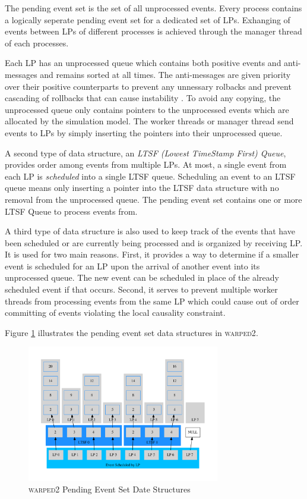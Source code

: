 \documentclass[11pt]{book}
\begin{document}
The pending event set is the set of all unprocessed events. Every process contains a
logically seperate pending event set for a dedicated set of LPs. Exhanging of events
between LPs of different processes is achieved through the manager thread of each processes.

Each LP has an unprocessed queue which contains both positive events and anti-messages and
remains sorted at all times. The anti-messages are given priority over their positive
counterparts to prevent any unnessary rolbacks and prevent cascading of rollbacks that can
cause instability \cite{lubachevsky-89}. To avoid any copying, the unprocessed queue only
contains pointers to the unprocessed events which are allocated by the simulation model. The
worker threads or manager thread send events to LPs by simply inserting the pointers into their
unprocessed queue.

A second type of data structure, an \emph{LTSF (Lowest TimeStamp First) Queue}, provides
order among events from multiple LPs. At most, a single event from each LP is \emph{scheduled}
into a single LTSF queue. Scheduling an event to an LTSF queue means only inserting a pointer
into the LTSF data structure with no removal from the unprocessed queue. The pending event
set contains one or more LTSF Queue to process events from.

A third type of data structure is also used to keep track of the events that have been
scheduled or are currently being processed and is organized by receiving LP. It is used for
two main reasons. First, it provides a way to determine if a smaller event is scheduled for
an LP upon the arrival of another event into its unprocessed queue. The new event can be
scheduled in place of the already scheduled event if that occurs. Second, it serves to
prevent multiple worker threads from processing events from the same LP which could cause
out of order committing of events violating the local causality constraint\cite{fujimoto-90}.

Figure \ref{pending_event_set} illustrates the pending event set data structures in
\textsc{warped2}.

\begin{figure}[H]
    \centering
    \includegraphics[width=0.75\textwidth]{figs/graphviz/pending_event_set.pdf}
    \caption{\textsc{warped2} Pending Event Set Date Structures}\label{pending_event_set}
\end{figure}
\end{document}
